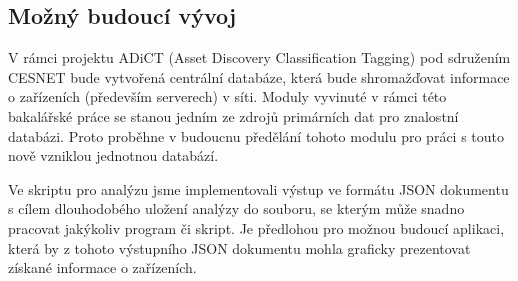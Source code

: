 \documentclass[thesis=B,czech,hidelinks]{FITthesis}[2019/03/21]
\begin{document}
\begin{conclusion}
	\section{Možný budoucí vývoj}
	V rámci projektu ADiCT (Asset Discovery Classification Tagging) pod sdružením CESNET bude vytvořená centrální databáze, která bude shromažďovat informace o zařízeních (především serverech) v síti. Moduly vyvinuté v rámci této bakalářské práce se stanou jedním ze zdrojů primárních dat pro znalostní databázi. Proto proběhne v budoucnu předělání tohoto modulu pro práci s touto nově vzniklou jednotnou databází.
	
	Ve skriptu pro analýzu jsme implementovali výstup ve formátu JSON dokumentu s cílem dlouhodobého uložení analýzy do souboru, se kterým může snadno pracovat jakýkoliv program či skript. Je předlohou pro možnou budoucí aplikaci, která by z tohoto výstupního JSON dokumentu mohla graficky prezentovat získané informace o zařízeních.
	
	
	
	
\end{conclusion}

%
%
\end{document}
